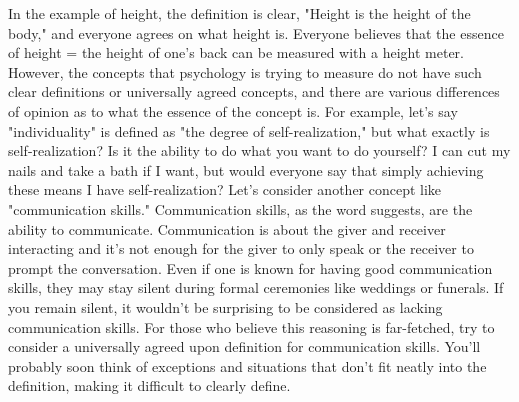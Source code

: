 \documentclass{ltjbook}
\begin{document}
In the example of height, the definition is clear, "Height is the height of the body," and everyone agrees on what height is. Everyone believes that the essence of height = the height of one’s back can be measured with a height meter. However, the concepts that psychology is trying to measure do not have such clear definitions or universally agreed concepts, and there are various differences of opinion as to what the essence of the concept is. For example, let's say "individuality" is defined as "the degree of self-realization," but what exactly is self-realization? Is it the ability to do what you want to do yourself? I can cut my nails and take a bath if I want, but would everyone say that simply achieving these means I have self-realization? Let’s consider another concept like "communication skills." Communication skills, as the word suggests, are the ability to communicate. Communication is about the giver and receiver interacting and it's not enough for the giver to only speak or the receiver to prompt the conversation. Even if one is known for having good communication skills, they may stay silent during formal ceremonies like weddings or funerals. If you remain silent, it wouldn't be surprising to be considered as lacking communication skills. For those who believe this reasoning is far-fetched, try to consider a universally agreed upon definition for communication skills. You'll probably soon think of exceptions and situations that don't fit neatly into the definition, making it difficult to clearly define.
\end{document}
